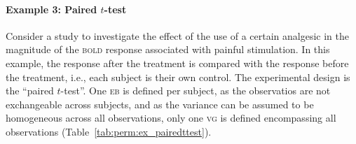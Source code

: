 \paragraph{Example 3: Paired $t$-test} Consider a study to investigate the effect of the use of a certain analgesic in the magnitude of the \textsc{bold} response associated with painful stimulation. In this example, the response after the treatment is compared with the response before the treatment, i.e., each subject is their own control. The experimental design is the ``paired $t$-test''. One \textsc{eb} is defined per subject, as the observatios are not exchangeable across subjects, and as the variance can be assumed to be homogeneous across all observations, only one \textsc{vg} is defined encompassing all observations (Table~\ref{tab:perm:ex_pairedttest}).

